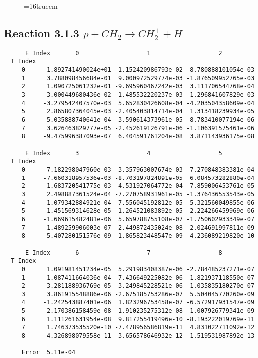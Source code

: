 \documentclass[12pt]{article}
\begin{document}
\begin{figure} \label{met.3_3.1.2}
\epsfxsize=16truecm
\end{figure}
\newpage
 
 
\subsection{ 
Reaction 3.1.3    $p + CH_2 \rightarrow CH_2^+ + H$
}
 

\begin{small}\begin{verbatim} 
      E Index       0                   1                   2
  T Index
     0     -1.892741490024e+01  1.152420986793e-02 -8.780888101054e-03
     1      3.788098456684e-01  9.000972529774e-03 -1.876509952765e-03
     2      1.090725061232e-01 -9.695960467242e-03  3.111706544768e-04
     3     -3.000449680436e-02  1.485532220237e-03  1.296841607829e-03
     4     -3.279542407570e-03  5.652830426608e-04 -4.203504358609e-04
     5      2.865807364045e-03 -2.405403814714e-04  1.313418239934e-05
     6     -5.035888740641e-04  3.590614373961e-05  8.783410077194e-06
     7      3.626463829777e-05 -2.452619126791e-06 -1.106391575461e-06
     8     -9.475996387093e-07  6.404591761204e-08  3.871143936175e-08
 
      E Index       3                   4                   5
  T Index
     0      7.182298047960e-03  3.357963007674e-03 -7.270848383381e-04
     1     -7.660318957536e-03 -8.703197824891e-05  6.084573282880e-04
     2      1.683720541775e-03 -4.531927064772e-04 -7.859006453761e-05
     3      2.498887361524e-04 -7.270758931961e-05 -1.376436553543e-05
     4     -1.079342884921e-04  7.556045192812e-05 -5.321560049855e-06
     5      1.451569314628e-05 -1.264521083892e-05  2.224266459969e-06
     6     -1.669615482481e-06  5.659788755108e-07 -1.750602933349e-07
     7      1.489259906003e-07  2.449872435024e-08 -2.024691997811e-09
     8     -5.407280151576e-09 -1.865823448547e-09  4.236089219820e-10
 
      E Index       6                   7                   8
  T Index
     0      1.091981451234e-05  5.291983408387e-06 -2.784485237271e-07
     1     -1.087411664036e-04  7.436649225082e-06 -1.821937118550e-07
     2      3.281188936769e-05 -3.249845228521e-06  1.035835180270e-07
     3      3.861915548886e-06 -2.675185753286e-07  5.504045770260e-09
     4     -1.242543887401e-06  1.823296753458e-07 -6.572917931547e-09
     5     -2.170386158459e-08 -1.910235275312e-08  1.007926779341e-09
     6      1.111261631954e-08  9.817255419496e-10 -8.193222019769e-11
     7      1.746373535520e-10 -7.478956586819e-11  4.831022711092e-12
     8     -4.326898079558e-11  3.656578646932e-12 -1.519531987892e-13
 
     Error  5.11e-04
\end{verbatim}\end{small}
\end{document}
